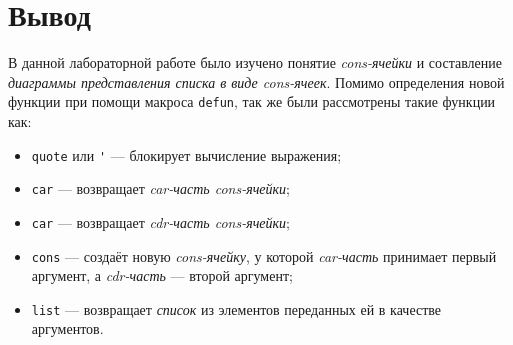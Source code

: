 \section{Вывод}

В данной лабораторной работе было изучено понятие \textit{cons-ячейки} и составление \textit{диаграммы представления списка в виде cons-ячеек}. Помимо определения новой функции при помощи макроса \verb|defun|, так же были рассмотрены такие функции как:
\begin{itemize}
	\item \verb|quote| или \verb|'| --- блокирует вычисление выражения;
	\item \verb|car| --- возвращает \textit{car-часть cons-ячейки};
	\item \verb|car| --- возвращает \textit{cdr-часть cons-ячейки};
	\item \verb|cons| --- создаёт новую \textit{cons-ячейку}, у которой \textit{car-часть} принимает первый аргумент, а \textit{cdr-часть} --- второй аргумент;
	\item \verb|list| --- возвращает \textit{список} из элементов переданных ей в качестве аргументов.
\end{itemize}